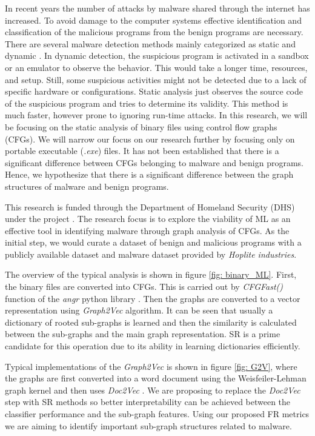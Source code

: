 \documentclass[11pt]{article}
\begin{document}
In recent years the number of attacks by malware shared through the internet has increased. To avoid damage to the computer systems effective identification and classification of the malicious programs from the benign programs are necessary. There are several malware detection methods mainly categorized as static and dynamic \cite{Akhtar2021}. In dynamic detection, the suspicious program is activated in a sandbox or an emulator to observe the behavior. This would take a longer time, resources, and setup. Still, some suspicious activities might not be detected due to a lack of specific hardware or configurations. Static analysis just observes the source code of the suspicious program and tries to determine its validity. This method is much faster, however prone to ignoring run-time attacks. In this research, we will be focusing on the static analysis of binary files using control flow graphs (CFGs). We will narrow our focus on our research further by focusing only on portable executable (\textit{.exe}) files. It has not been established that there is a significant difference between CFGs belonging to malware and benign programs. Hence, we hypothesize that there is a significant difference between the graph structures of malware and benign programs.

This research is funded through the Department of Homeland Security (DHS) under the project . The research focus is to explore the viability of ML as an effective tool in identifying malware through graph analysis of CFGs. As the initial step, we would curate a dataset of benign and malicious programs with a publicly available dataset and malware dataset provided by \textit{Hoplite industries}.

The overview of the typical analysis is shown in figure \ref{fig: binary_ML}. First, the binary files are converted into CFGs. This is carried out by \textit{CFGFast()} function of the \textit{angr} python library \cite{shoshitaishvili2016state, stephens2016driller, shoshitaishvili2015firmalice }. Then the graphs are converted to a vector representation using \textit{Graph2Vec} algorithm\cite{Narayanan2017}. It can be seen that usually a dictionary of rooted sub-graphs is learned and then the similarity is calculated between the sub-graphs and the main graph representation. SR is a prime candidate for this operation due to its ability in learning dictionaries efficiently.

Typical implementations of the \textit{Graph2Vec} is shown in figure \ref{fig: G2V}, where the graphs are first converted into a word document using the Weisfeiler-Lehman graph kernel \cite{Shervashidze2011} and then uses \textit{Doc2Vec} \cite{Le2014}. We are proposing to replace the \textit{Doc2Vec} step with SR methods so better interpretability can be achieved between the classifier performance and the sub-graph features. Using our proposed FR metrics we are aiming to identify important sub-graph structures related to malware. 
\end{document}
